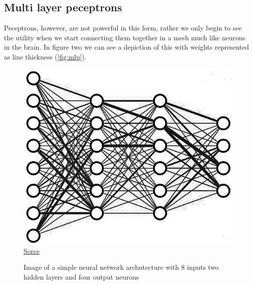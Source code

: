 \documentclass{article}
\begin{document}
\subsection{Multi layer peceptrons}
\label{sec:mlp}
Peceptrons, however, are not powerful in this form, rather we only begin to see the utility when we start connecting them together in a mesh much like neurons in the brain. In figure two we can see a depiction of this with weights represented as line thickness (\autoref{fig:mlp}).
\begin{figure}[h]
\caption{Image of a simple neural network archutecture with 8 inputs two hidden layers and four output neurons}
\label{fig:mlp}
\includegraphics[scale=2]{nn.jpg}
\href{https://www.youtube.com/watch?v=aircAruvnKk&ab_channel=3Blue1Brown}{Sorce}
\end{figure}
\end{document}
